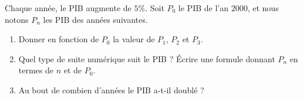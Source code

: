 
\begin{exercice}\label{exosmath-0284}

Chaque année, le PIB augmente de \( 5\%\). Soit \( P_0\) le PIB de l'an \( 2000\), et nous notons \( P_n\) les PIB des années suivantes.
\begin{enumerate}
    \item
        Donner en fonction de \( P_0\) la valeur de \( P_1\), \( P_2\) et \( P_3\).
    \item
        Quel type de suite numérique suit le PIB ? Écrire une formule donnant \( P_n\) en termes de \( n\) et de \( P_0\).
    \item
    Au bout de combien d'années le PIB a-t-il doublé ?
\end{enumerate}

\end{exercice}
